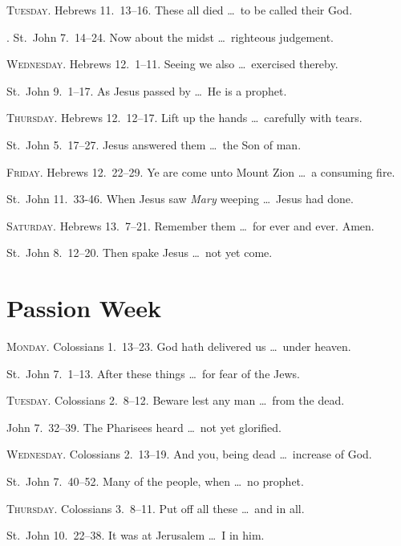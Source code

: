 {\scshape Tuesday.}  Hebrews 11.~13–16.   These all died \ldots\ to be called their God.

. St.~John 7.~14–24.   Now about the midst \ldots\ righteous judgement.

{\scshape Wednesday.}  Hebrews 12.~1–11.   Seeing we also \ldots\ exercised thereby.

 St.~John 9.~1–17.   As Jesus passed by \ldots\ He is a prophet.

{\scshape Thursday.}  Hebrews 12.~12–17.   Lift up the hands \ldots\ carefully with tears.

 St.~John 5.~17–27.   Jesus answered them \ldots\ the Son of man.

{\scshape Friday.}  Hebrews 12.~22–29.   Ye are come unto Mount Zion \ldots\ a consuming fire.

 St.~John 11.~33-46.   When Jesus saw \emph{Mary} weeping \ldots\ Jesus had done.

{\scshape Saturday.}  Hebrews 13.~7–21.   Remember them \ldots\ for ever and ever. Amen.

 St.~John 8.~12–20.   Then spake Jesus \ldots\ not yet come.
 

\section{Passion Week}

{\scshape Monday.}  Colossians 1.~13–23.   God hath delivered us \ldots\ under heaven.

 St.~John 7.~1–13.   After these things \ldots\ for fear of the Jews.

{\scshape Tuesday.}  Colossians 2.~8–12.   Beware lest any man \ldots\ from the dead.

 John 7.~32–39.   The Pharisees heard \ldots\ not yet glorified.

{\scshape Wednesday.}  Colossians 2.~13–19.   And you, being dead \ldots\ increase of God.
    
 St.~John 7.~40–52.   Many of the people, when \ldots\ no prophet.

{\scshape Thursday.}  Colossians 3.~8–11.   Put off all these \ldots\ and in all.

 St.~John 10.~22–38.   It was at Jerusalem \ldots\ I in him.

